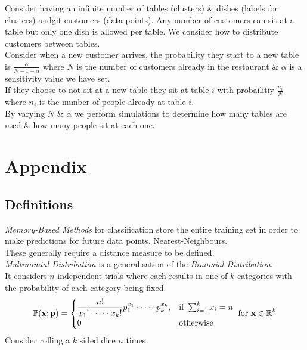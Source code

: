 \documentclass[11pt,a4paper]{article}
\begin{document}
Consider having an infinite number of tables (clusters) \& dishes (labels for clusters) andgit customers (data points). Any number of customers can sit at a table but only one dish is allowed per table. We consider how to distribute customers between tables.\\
Consider when a new customer arrives, the probability they start to a new table is $\frac{\alpha}{N-1-\alpha}$ where $N$ is the number of customers already in the restaurant \& $\alpha$ is a sensitivity value we have set.\\
If they choose to not sit at a new table they sit at table $i$ with probailitiy $\frac{n_i}{N}$ where $n_i$ is the number of people already at table $i$.\\
By varying $N$ \& $\alpha$ we perform simulations to determine how many tables are used \& how many people sit at each one.\\

\proposition{}

\newpage
\setcounter{section}{-1}
\section{Appendix}

\subsection{Definitions}

\textit{Memory-Based Methods} for classification store the entire training set in order to make predictions for future data points. \eg Nearest-Neighbours.\\
\nb These generally require a distance measure to be defined.\\

\textit{Multinomial Distribution} is a generalisation of the \textit{Binomial Distribution}.\\
It considers $n$ independent trials where each results in one of $k$ categories with the probability of each category being fixed.\\
$$\mathbb{P}(\textbf{x};\textbf{p})=\begin{cases}\dfrac{n!}{x_1!\cdot\dots\cdot x_k!}p_1^{x_1}\cdot\dots\cdot p_k^{x_k},&\text{if }\sum_{i=1}^kx_i=n\\0&\text{otherwise}\end{cases}\text{ for }\textbf{x}\in\mathbb{R}^k$$
\nb Consider rolling a $k$ sided dice $n$ times
\end{document}

